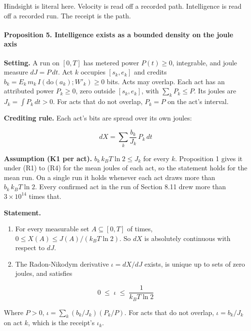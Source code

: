 \documentclass[
  10pt,
]{article}
\providecommand{\tightlist}{%
  \setlength{\itemsep}{0pt}\setlength{\parskip}{0pt}}
\begin{document}
Hindsight is literal here. Velocity is read off a recorded path.
Intelligence is read off a recorded run. The receipt is the path.

\paragraph{Proposition 5. Intelligence exists as a bounded density on
the joule
axis}\label{proposition-5.-intelligence-exists-as-a-bounded-density-on-the-joule-axis}

\textbf{Setting.} A run on \([0, T]\) has metered power \(P(t) \ge 0\),
integrable, and joule measure \(dJ = P\,dt\). Act \(k\) occupies
\([s_k, e_k]\) and credits
\(b_k = E_k\, m_k\, I(\mathrm{do}(a_k); W'_k) \ge 0\) bits. Acts may
overlap. Each act has an attributed power \(P_k \ge 0\), zero outside
\([s_k, e_k]\), with \(\sum_k P_k \le P\). Its joules are
\(J_k = \int P_k\,dt > 0\). For acts that do not overlap, \(P_k = P\) on
the act's interval.

\textbf{Crediting rule.} Each act's bits are spread over its own joules:

\[dX = \sum_k \frac{b_k}{J_k}\, P_k\, dt\]

\textbf{Assumption (K1 per act).} \(b_k\, k_B T \ln 2 \le J_k\) for
every \(k\). Proposition 1 gives it under (R1) to (R4) for the mean
joules of each act, so the statement holds for the mean run. On a single
run it holds whenever each act draws more than \(b_k\, k_B T\ln 2\).
Every confirmed act in the run of Section 8.11 drew more than
\(3 \times 10^{14}\) times that.

\textbf{Statement.}

\begin{enumerate}
\def\labelenumi{\arabic{enumi}.}
\tightlist
\item
  For every measurable set \(A \subseteq [0,T]\) of times,
  \(0 \le X(A) \le J(A)/(k_B T\ln 2)\). So \(dX\) is absolutely
  continuous with respect to \(dJ\).
\item
  The Radon-Nikodym derivative \(\iota = dX/dJ\) exists, is unique up to
  sets of zero joules, and satisfies
\end{enumerate}

\[0 \;\le\; \iota \;\le\; \frac{1}{k_B T \ln 2}\]

Where \(P > 0\), \(\iota = \sum_k (b_k/J_k)(P_k/P)\). For acts that do
not overlap, \(\iota = b_k/J_k\) on act \(k\), which is the receipt's
\(\iota_k\).
\end{document}
